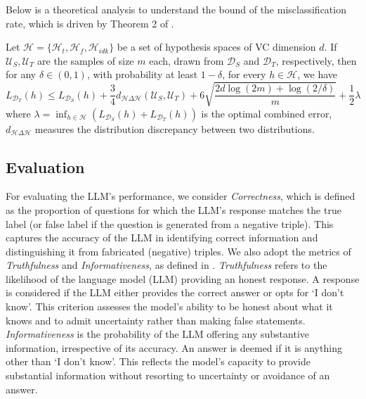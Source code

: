 Below is a theoretical analysis to understand the bound of the misclassification rate, which is driven by Theorem 2 of \cite{ben2010theory}.

\begin{theoremthm}
Let $\mathcal{H} = \{\mathcal{H}_t, \mathcal{H}_f, \mathcal{H}_{idk}\}$ be a set of hypothesis spaces of VC dimension $d$. If $\mathcal{U}_S, \mathcal{U}_T$ are the samples of size $m$ each, drawn from $\mathcal{D}_S$ and $\mathcal{D}_T$, respectively, then for any $\delta \in (0, 1)$, with probability at least $1-\delta$, for every $h \in \mathcal{H}$, we have
\begin{equation}
    L_{\mathcal{D}_T} \left(h\right) \leq L_{\mathcal{D}_S} \left(h\right) + \frac{3}{4} d_{\mathcal{H} \Delta\mathcal{H}} \left(\mathcal{U}_S, \mathcal{U}_T\right) + 6 \sqrt{\frac{2d \log \left(2m\right) + \log\left(2/\delta\right)}{m}} + \frac{1}{2} \lambda
\end{equation}
where $\lambda = \inf_{h \in \mathcal{H}} \left(L_{\mathcal{D}_S}\left(h\right) + L_{\mathcal{D}_T}\left(h\right)\right)$ is the optimal combined error, $d_{\mathcal{H} \Delta\mathcal{H}}$ measures the distribution discrepancy between two distributions. 
\end{theoremthm}



\subsection{Evaluation}


For evaluating the LLM's performance, we consider \textit{Correctness}, which is defined as the proportion of questions for which the LLM's response matches the true label (or false label if the question is generated from a negative triple). This captures the accuracy of the LLM in identifying correct information and distinguishing it from fabricated (negative) triples.
We also adopt the metrics of \textit{Truthfulness} and \textit{Informativeness}, as defined in \cite{TruthfulQA}. \textit{Truthfulness} refers to the likelihood of the language model (LLM) providing an honest response. A response is considered \Truthful{} if the LLM either provides the correct answer or opts for `I don't know'. This criterion assesses the model's ability to be honest about what it knows and to admit uncertainty rather than making false statements. \textit{Informativeness} is the probability of the LLM offering any substantive information, irrespective of its accuracy. An answer is deemed \Informative{} if it is anything other than `I don't know'. This reflects the model's capacity to provide substantial information without resorting to uncertainty or avoidance of an answer. 

